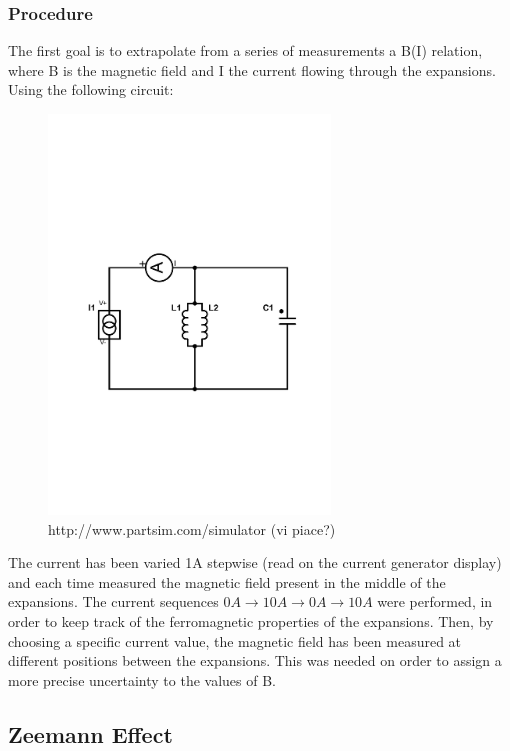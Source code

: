 \documentclass[a4paper,12pt,abstracton]{scrartcl}
\begin{document}
\subsubsection{Procedure}
The first goal is to extrapolate from a series of measurements a B(I) relation, where B is the magnetic field and I the current flowing through the expansions. 
Using the following circuit:
\begin{figure}[H]
\begin{center}
\includegraphics[trim=3cm 8cm 2.5cm 10cm,clip,width=7.5cm,keepaspectratio]{circuito1.pdf} 
\caption{http://www.partsim.com/simulator (vi piace?)}
\end{center} 
\end{figure}
The current has been varied 1A stepwise (read on the current generator display) and each time measured the magnetic field present in the middle of the expansions. The current sequences $0A \longrightarrow 10A \longrightarrow 0A \longrightarrow 10A$ were performed, in order to keep track of the ferromagnetic properties of the expansions.
Then, by choosing a specific current value, the magnetic field has been measured at different positions between the expansions. This was needed on order to assign a more precise uncertainty to the values of B.
\subsection{Zeemann Effect}
\end{document}
